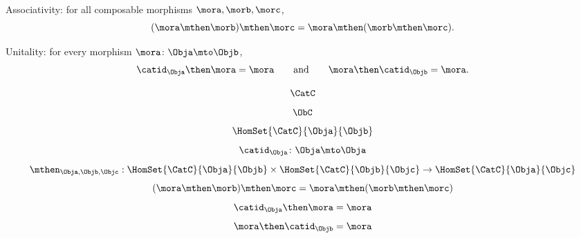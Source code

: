 {\begin{forslides}
\begin{ctdefinition}
\begin{body}
\begin{compactenum}
                \end{compactenum}
                \condit
                \begin{compactenum}
                    \item Associativity: for all composable morphisms $\mora, \morb, \morc$,
                    $$ (\mora\mthen \morb)
                    \mthen \morc= \mora \mthen (\morb \mthen \morc).$$
                    \item Unitality: for every morphism $\mora \colon \Obja \mto \Objb$,
                    $$ \catid_{\Obja} \then \mora = \mora \quad \quad \text{and} \quad \quad \mora \then \catid_{\Objb} = \mora. $$
                \end{compactenum}
            \end{body}
        \end{ctdefinition}
%
        \begin{equation}
            \label{eq:15}
            \CatC
        \end{equation}
%
        \begin{equation}
            \label{eq:16}
            \ObC
        \end{equation}
%
        \begin{equation}
            \label{eq:17}
            \HomSet{\CatC}{\Obja}{\Objb}
        \end{equation}
%
        \begin{equation}
            \label{eq:18}
            \catid_{\Obja}\colon \Obja \mto \Obja
        \end{equation}
%
        \begin{equation}
            \label{eq:19}
            \mthen_{\Obja,\Objb,\Objc}: \HomSet{\CatC}{\Obja}{\Objb} \times \HomSet{\CatC}{\Objb}{\Objc}\to \HomSet{\CatC}{\Obja}{\Objc}
        \end{equation}
%
        \begin{equation}
            \label{eq:20}
            (\mora\mthen \morb)
            \mthen \morc= \mora \mthen (\morb \mthen \morc)
        \end{equation}
%
        \begin{equation}
            \label{eq:21}
            \catid_{\Obja} \then \mora = \mora
        \end{equation}
%
        \begin{equation}
            \label{eq:22}
            \mora \then \catid_{\Objb} = \mora
        \end{equation}
%
        \begin{equation}

\end{equation}
\end{forslides}}
